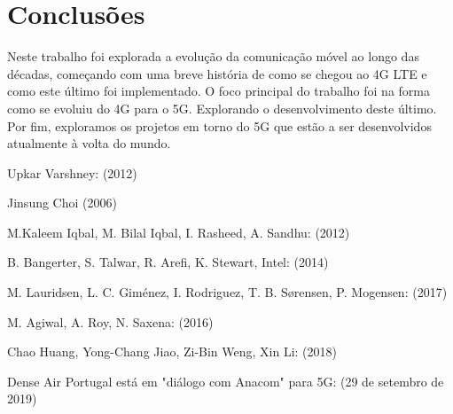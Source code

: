 \documentclass{llncs}
\begin{document}
\section{Conclusões}
Neste trabalho foi explorada a evolução da comunicação móvel ao longo
das décadas, começando com uma breve história de como se chegou ao
4G LTE e como este último foi implementado.
O foco principal do trabalho foi na forma como se evoluiu do 4G para o
5G. Explorando o desenvolvimento deste último.
Por fim, exploramos os projetos em torno do 5G que estão a ser
desenvolvidos atualmente à volta do mundo.

\begin{thebibliography}{1}

Upkar Varshney:
 (2012)

Jinsung Choi
 (2006)

M.Kaleem Iqbal, M. Bilal Iqbal, I. Rasheed, A. Sandhu:
 (2012)

B. Bangerter, S. Talwar, R. Arefi, K. Stewart, Intel:
 (2014)

M. Lauridsen, L. C. Giménez, I. Rodriguez, T. B. Sørensen, P. Mogensen:
 (2017)

M. Agiwal, A. Roy, N. Saxena:
 (2016)

Chao Huang, Yong-Chang Jiao, Zi-Bin Weng, Xin Li:
 (2018) 

Dense Air Portugal está em "diálogo com Anacom" para 5G:
(29 de setembro de 2019)


\end{thebibliography}
\end{document}

